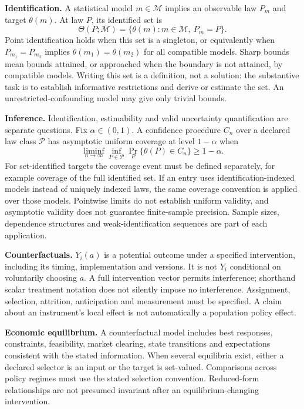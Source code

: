 \documentclass[11pt,a4paper]{article}
\begin{document}
\textbf{Identification.} A statistical model $m\in\mathcal M$ implies an observable law $P_m$ and target $\theta(m)$. At law $P$, its identified set is
\[
\Theta(P;\mathcal M)=\{\theta(m):m\in\mathcal M,\ P_m=P\}.
\]
Point identification holds when this set is a singleton, or equivalently when $P_{m_1}=P_{m_2}$ implies $\theta(m_1)=\theta(m_2)$ for all compatible models. Sharp bounds mean bounds attained, or approached when the boundary is not attained, by compatible models. Writing this set is a definition, not a solution: the substantive task is to establish informative restrictions and derive or estimate the set. An unrestricted-confounding model may give only trivial bounds.

\textbf{Inference.} Identification, estimability and valid uncertainty quantification are separate questions. Fix $\alpha\in(0,1)$. A confidence procedure $C_n$ over a declared law class $\mathcal P$ has asymptotic uniform coverage at level $1-\alpha$ when
\[
\liminf_{n\to\infty}\inf_{P\in\mathcal P}\Pr_P\{\theta(P)\in C_n\}\geq1-\alpha.
\]
For set-identified targets the coverage event must be defined separately, for example coverage of the full identified set. If an entry uses identification-indexed models instead of uniquely indexed laws, the same coverage convention is applied over those models. Pointwise limits do not establish uniform validity, and asymptotic validity does not guarantee finite-sample precision. Sample sizes, dependence structures and weak-identification sequences are part of each application.

\textbf{Counterfactuals.} $Y_i(a)$ is a potential outcome under a specified intervention, including its timing, implementation and versions. It is not $Y_i$ conditional on voluntarily choosing $a$. A full intervention vector permits interference; shorthand scalar treatment notation does not silently impose no interference. Assignment, selection, attrition, anticipation and measurement must be specified. A claim about an instrument's local effect is not automatically a population policy effect.

\textbf{Economic equilibrium.} A counterfactual model includes best responses, constraints, feasibility, market clearing, state transitions and expectations consistent with the stated information. When several equilibria exist, either a declared selector is an input or the target is set-valued. Comparisons across policy regimes must use the stated selection convention. Reduced-form relationships are not presumed invariant after an equilibrium-changing intervention.
\end{document}

